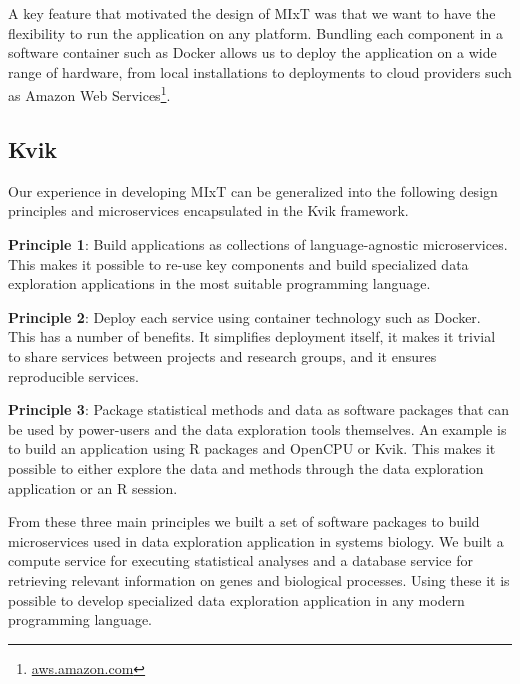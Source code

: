 A key feature that motivated the design of MIxT was that we want to
have the flexibility to run the application on any platform. Bundling each
component in a software container such as Docker allows us to deploy the
application on a wide range of hardware, from local installations to deployments
to cloud providers such as Amazon Web Services\footnote{\url{aws.amazon.com}}.



\subsection*{Kvik}
Our experience in developing MIxT can be generalized into the following design
principles and microservices encapsulated in the Kvik framework. 

\textbf{Principle 1}: Build applications as collections of language-agnostic
microservices. This makes it possible to re-use key components and build
specialized data exploration applications in the most suitable programming
language. 

\textbf{Principle 2}: Deploy each service using container technology such as
Docker. This has a number of benefits. It simplifies deployment itself, it makes
it trivial to share services between projects and research groups, and it
ensures reproducible services.

\textbf{Principle 3}: Package statistical methods and data as software packages
that can be used by power-users and the data exploration tools themselves. An
example is to build an application using R packages and OpenCPU or Kvik. This
makes it possible to either explore the data and methods through the data
exploration application or an R session. 

From these three main principles we built a set of software packages to build
microservices used in data exploration application in systems biology. We built
a compute service for executing statistical analyses and a database service for
retrieving relevant information on genes and biological processes.  Using these
it is possible to develop specialized data exploration application in any modern
programming language.  


